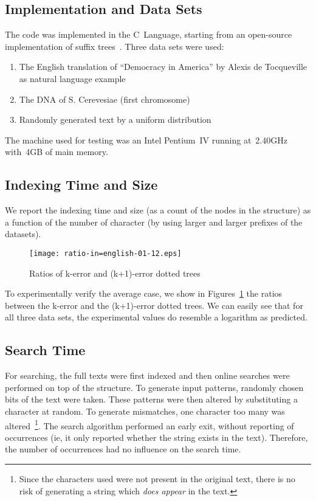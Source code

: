 \subsection{Implementation and Data Sets}

The code was implemented in the C~Language, starting from an open-source implementation of suffix trees~\cite{ansicimplementation}. Three data sets were used:

\begin{enumerate}
\item The English translation of ``Democracy in America'' by Alexis de Tocqueville as natural language example
\item The DNA of S. Cerevesiae (first chromosome)
\item Randomly generated text by a uniform distribution
\end{enumerate}

The machine used for testing was an Intel Pentium~IV running at~2.40GHz with~4GB of main memory.

\subsection{Indexing Time and Size}

We report the indexing time and size (as a count of the nodes in the structure) as a function of the number of character (by using larger and larger prefixes of the datasets).

\begin{figure}%
\centering
\texttt{[image: ratio-in=english-01-12.eps]}%
\caption{Ratios of k-error and (k+1)-error dotted trees}\label{fig:ratios}%
\end{figure}

To experimentally verify the average case, we show in Figures~\ref{fig:ratios} the ratios between the k-error and the (k+1)-error dotted trees. We can easily see that for all three data sets, the experimental values do resemble a logarithm as predicted.

\subsection{Search Time}

For searching, the full texts were first indexed and then online searches were performed on top of the structure. To generate input patterns, randomly chosen bits of the text were taken. These patterns were then altered by substituting a character at random. To generate mismatches, one character too many was altered~\footnote{Since the characters used were not present in the original text, there is no risk of generating a string which \emph{does appear} in the text.}. The search algorithm performed an early exit, without reporting of occurrences (ie, it only reported whether the string exists in the text). Therefore, the number of occurrences had no influence on the search time.

